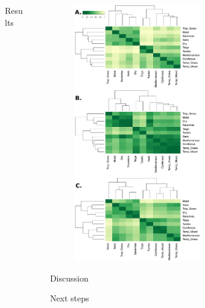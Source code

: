 \documentclass[final]{beamer}
\newlength{\sepwid}
\newlength{\onecolwid}
\begin{document}
\begin{frame}[t]
\begin{columns}[t]
\begin{column}{\onecolwid}
\begin{block}{Results}
		 \end{block}


 \end{column}



  \begin{column}{\sepwid}\end{column}			%
  \begin{column}{\onecolwid}



	\begin{figure}[h]
		\centering
		\includegraphics[width=0.6\textwidth]{./figures/heatmaps.pdf}
		\caption{}
		\label{}
	\end{figure}




			\begin{block}{Discussion}

      		\end{block}

      		\begin{block}{Next steps}


\end{block}
\end{column}
\end{columns}
\end{frame}
\end{document}
